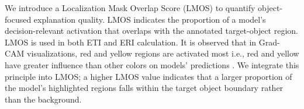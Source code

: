 \documentclass[a4paper,fleqn]{cas-dc}
\begin{document}
	We introduce a Localization Mask Overlap Score (LMOS) to quantify object-focused explanation quality.
	LMOS indicates the proportion of a model's decision-relevant activation that overlaps with the annotated target-object region. 
	LMOS is used in both ETI and ERI calculation.  
	It is observed that in Grad-CAM visualizations, red and yellow regions are activated most i.e., red and yellow have greater influence than other colors on models' predictions \cite{r27,r28}. 
   	We integrate this principle into LMOS; a higher LMOS value indicates that a larger proportion of the model's highlighted regions falls within the target object boundary rather than the background.
	
	
	
	
	
\end{document}
